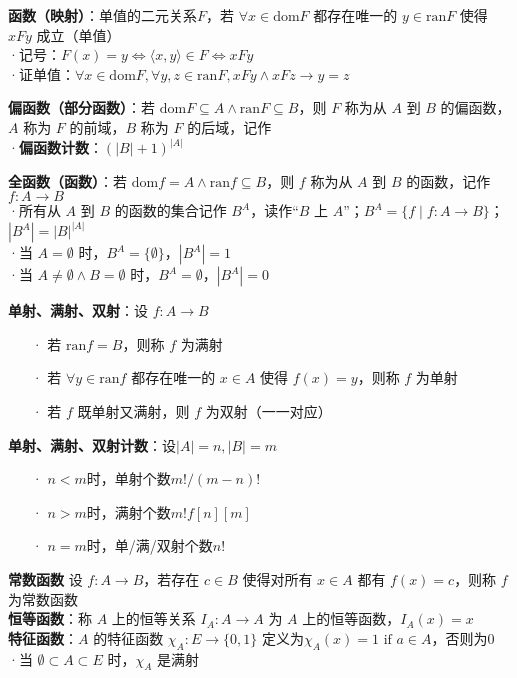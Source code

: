 	\textbf{函数（映射）}：单值的二元关系$F$，若 $\forall x \in \text{dom} F$ 都存在唯一的 $y \in \text{ran} F$ 使得 $xFy$ 成立（单值）\\
	·记号：$F(x) = y \Leftrightarrow \langle x, y \rangle \in F \Leftrightarrow x F y$\\
	·证单值：$\forall x \in \text{dom} F, \forall y, z \in \text{ran} F, x F y \land x F z \rightarrow y = z$
	
	\textbf{偏函数（部分函数）}：若 $\text{dom} F \subseteq A \land \text{ran} F \subseteq B$，则 $F$ 称为从 $A$ 到 $B$ 的偏函数，$A$ 称为 $F$ 的前域，$B$ 称为 $F$ 的后域，记作\\
	·\textbf{偏函数计数}：$(|B|+1)^{|A|}$
	
	\textbf{全函数（函数）}：若 $\text{dom} f = A \land \text{ran} f \subseteq B$，则 $f$ 称为从 $A$ 到 $B$ 的函数，记作 $f: A \rightarrow B$\\
	·所有从 $A$ 到 $B$ 的函数的集合记作 $B^A$，读作“$B$ 上 $A$”；$B^A = \{ f \mid f: A \rightarrow B \}$；$|B^A| = |B|^{|A|}$\\
	·当 $A = \emptyset$ 时，$B^A = \{ \emptyset \}$，$|B^A| = 1$\\
	·当 $A \neq \emptyset \land B = \emptyset$ 时，$B^A = \emptyset$，$|B^A| = 0$
		
	\textbf{单射、满射、双射}：设 $f: A \rightarrow B$
	\begin{itemize}
		\item[·] 若 $\text{ran} f = B$，则称 $f$ 为满射
		\item[·] 若 $\forall y \in \text{ran} f$ 都存在唯一的 $x \in A$ 使得 $f(x) = y$，则称 $f$ 为单射
		\item[·] 若 $f$ 既单射又满射，则 $f$ 为双射（一一对应）
	\end{itemize}
	\textbf{单射、满射、双射计数}：设$|A|=n, |B|=m$
	\begin{itemize}
		\item[·] $n<m$时，单射个数$m!/(m-n)!$
		\item[·] $n>m$时，满射个数$m!f[n][m]$
		\item[·] $n=m$时，单/满/双射个数$n!$
	\end{itemize}
	
	\textbf{常数函数} 设 $f: A \rightarrow B$，若存在 $c \in B$ 使得对所有 $x \in A$ 都有 $f(x) = c$，则称 $f$ 为常数函数\\
	\textbf{恒等函数}：称 $A$ 上的恒等关系 $I_A: A\rightarrow A$ 为 $A$ 上的恒等函数，$I_A(x) = x$\\
	\textbf{特征函数}：$A$ 的特征函数 $\chi_{A}: E \rightarrow \{0, 1\}$ 定义为$\chi_{A}(x) = 1\text{ if } a \in A$，否则为$0$\\
	·当 $\emptyset \subset A \subset E$ 时，$\chi_{A}$ 是满射
	
